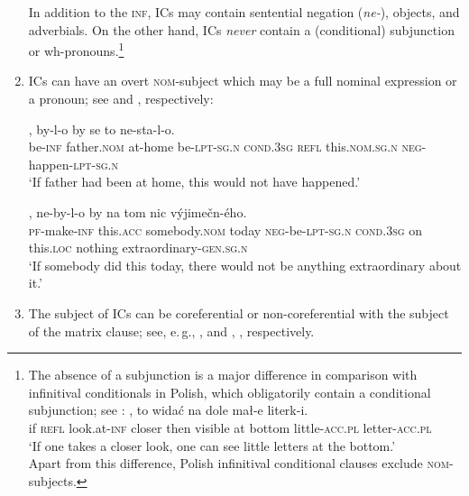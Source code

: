 \documentclass[output=paper,colorlinks,citecolor=brown,
modfonts,newtxmath
]{langscibook}
\begin{document}
\begin{enumerate}
In addition to the \textsc{inf}, ICs may contain sentential negation (\textit{ne-}), objects, and adverbials. On the other hand, ICs \textit{never} contain a (conditional) subjunction or wh-pronouns.\footnote{The absence of a subjunction is a major difference in comparison with infinitival conditionals in Polish, which obligatorily contain a conditional subjunction; see : 
\ea\label{ex:Polish}
, to widać na dole mał-e literk-i.\\ 
     {} if \textsc{refl} look.at-\textsc{inf} closer then visible at bottom little-\textsc{acc.pl} letter-\textsc{acc.pl}\\
\glt `If one takes a closer look, one can see little letters at the bottom.' \\ \hfill \citep[Polish;][455]{EngelKuc1999}
\z
Apart from this difference, Polish infinitival conditional clauses exclude \textsc{nom}-subjects.}

\item ICs can have an overt \textsc{nom}-subject which may be a full nominal expression or a pronoun; see  and , respectively:

\ea\label{ex:father}
, by-l-o by se to ne-sta-l-o.\\
     {} be-\textsc{inf} father.\textsc{nom} {at-home} be-\textsc{lpt-sg.n} \textsc{cond.3sg} \textsc{refl} this.\textsc{nom.sg.n} \textsc{neg}-happen-\textsc{lpt-sg.n}\\
\glt `If father had been at home, this would not have happened.' \\ \hfill \citep[Czech;][65]{Svoboda1960a}
\z

\ea\label{ex:extraordinary}
, ne-by-l-o by na tom nic výjimečn-ého.\\
     {} \textsc{pf}-make-\textsc{inf} this.\textsc{acc} somebody.\textsc{nom} today \textsc{neg}-be-\textsc{lpt-sg.n} \textsc{cond.3sg} on this.\textsc{loc} nothing extraordinary-\textsc{gen.sg.n}\\ 
\glt `If somebody did this today, there would not be anything extraordinary about it.' \hfill \citep[Czech;][1]{Milotova2012}
\z

\item The subject of ICs can be coreferential or non-coreferential with the subject of the matrix clause; see, e.\,g., ,  and , , respectively.


\end{enumerate}
\end{document}
